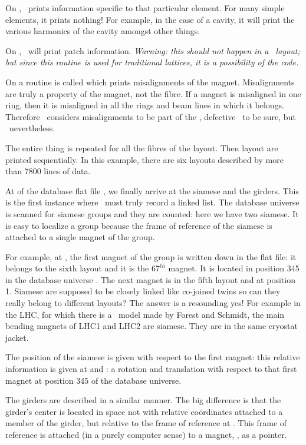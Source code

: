   On , \PTC\ prints information specific to that particular element. For many simple elements, it prints nothing! For example, in the case of a cavity, it will print the various harmonics of the cavity amongst other things. 

On , \PTC\ will print patch information. \emph{Warning: this should not happen in a \DNA\ layout; but since this routine is used for traditional lattices, it is a possibility of the code.} 

On  a routine is called which prints misalignments of the magnet. Misalignments are truly a property of the magnet, not the fibre.  If a magnet is misaligned in one ring, then it is misaligned in all the rings and beam lines in which it belongs. Therefore \PTC\ considers misalignments to be part of the \DNA , defective \DNA\ to be sure, but \DNA\ nevertheless. 
 
The entire thing is repeated for all the fibres of the layout. Then layout are printed sequentially. In this example, there are six layouts described by more than  7800 lines of data. 

At  of the database flat file , we finally arrive at the siamese and the girders. This is the first instance where \PTC\ must truly record a linked list.  The database universe is scanned for siamese groups and they are counted: here we have two siamese. It is easy to localize a group because the frame of reference of the siamese is attached to a single magnet of the group. 

For example, at , the first magnet of the group is written down in the flat file:  it belongs to the sixth layout and it is the $67^{th}$ magnet. It is located in position 345 in the database universe . The next magnet is in the fifth layout and at position 1.  Siamese are supposed to be closely linked like co-joined twins so can they really belong to different layouts? The answer is a resounding yes! For example in the LHC, for which there is a \PTC\ model made by Forest and Schmidt, the main bending magnets of LHC1 and LHC2 are siamese. They are in the same cryostat jacket. 

The position of the siamese is given with respect to the first magnet: this relative information is given at  and  : a rotation and translation with respect to that first magnet at position 345 of the database universe.


The girders are described in a similar manner. The big difference is that the girder's center is located in space not with relative co\"ordinates attached to a member of the girder, but relative to the  frame of reference at  . This frame of reference is attached (in a purely computer sense) to a magnet, , as a pointer. 

